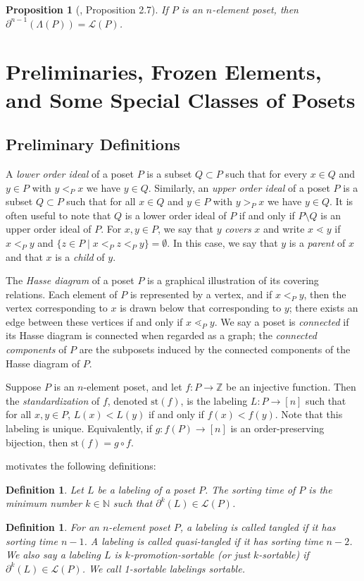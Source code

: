\documentclass[11pt]{amsart}
\newtheorem{prop}[thm]{Proposition}
\newtheorem{Definition}[thm]{Definition}
\newenvironment{definition}
{\begin{Definition}\rm}{\end{Definition}}
\theoremstyle{definition}
\newcommand{\N}{\mathbb{N}}
\newcommand{\Z}{\mathbb{Z}}
\newcommand{\call}{\mathcal{L}}
\newcommand{\st}{\mathrm{st}}
\begin{document}
\begin{prop}[\cite{DK20}, Proposition 2.7]\label{sorting}
	If $ P $ is an $ n $-element poset, then $ \partial^{n-1}(\Lambda(P))=\call(P) $.
\end{prop}
\section{Preliminaries, Frozen Elements, and Some Special Classes of Posets}\label{Background}

\subsection{Preliminary Definitions}A \emph{lower order ideal} of a poset $ P $ is a subset $ Q\subset P $ such that for every $ x\in Q $ and $ y\in P $ with $ y<_Px $ we have $ y\in Q $. Similarly, an \emph{upper order ideal} of a poset $ P $ is a subset $ Q\subset P $ such that for all $ x\in Q $ and $ y\in P $ with $ y>_Px $ we have $ y\in Q $. It is often useful to note that $ Q $ is a lower order ideal of $ P $ if and only if $ P\setminus Q $ is an upper order ideal of $ P $. For $ x,y\in P $, we say that $ y $ \emph{covers} $ x $ and write $ x\lessdot y $ if $ x<_Py $ and $ \{z\in P\;|\;x<_Pz<_Py\}=\emptyset $. In this case, we say that $ y $ is a \emph{parent} of $ x $ and that $ x $ is a \emph{child} of $ y $. 

The \emph{Hasse diagram} of a poset $ P $ is a graphical illustration of its covering relations. Each element of $ P $ is represented by a vertex, and if $ x<_Py $, then the vertex corresponding to $ x $ is drawn below that corresponding to $ y $; there exists an edge between these vertices if and only if $ x\lessdot_P y $. We say a poset is \emph{connected} if its Hasse diagram is connected when regarded as a graph; the \emph{connected components} of $ P $ are the subposets induced by the connected components of the Hasse diagram of $ P $.

Suppose $ P $ is an $ n $-element poset, and let $ f:P\to\Z $ be an injective function. Then the \emph{standardization} of $ f $, denoted $ \st(f) $, is the labeling $ L:P\to[n] $ such that for all $ x,y\in P $, $ L(x)<L(y) $ if and only if $ f(x)<f(y) $. Note that this labeling is unique. Equivalently, if $ g:f(P)\to[n] $ is an order-preserving bijection, then $ \st(f)=g\circ f $.

 motivates the following definitions:
\begin{definition}
	Let $ L $ be a labeling of a poset $ P $. The \emph{sorting time} of $ P $ is the minimum number $ k\in\N $ such that $ \partial^k(L)\in\call(P) $.
\end{definition}
\begin{definition}
	For an $ n $-element poset $ P $, a labeling is called \emph{tangled} if it has sorting time $ n-1 $. A labeling is called \emph{quasi-tangled} if it has sorting time $ n-2 $.	We also say a labeling $ L $ is $ k $\emph{-promotion-sortable} (or just $ k $\emph{-sortable}) if $ \partial^k(L)\in\call(P) $. We call 1-sortable labelings \emph{sortable}. 
\end{definition}
\end{document}
